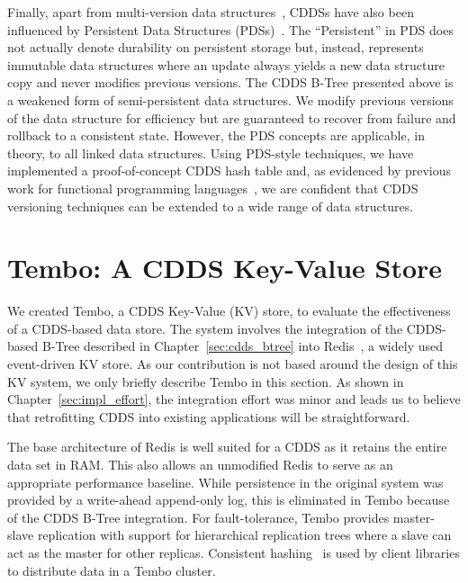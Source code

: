 Finally, apart from multi-version data
structures~\citep{Becker96,Varman97}, CDDSs have also been influenced
by Persistent Data Structures (PDSs)~\citep{Driscoll89}.  The
``Persistent'' in PDS does not actually denote durability on
persistent storage but, instead, represents immutable data structures
where an update always yields a new data structure copy and never
modifies previous versions.  The CDDS B-Tree presented above is a
weakened form of semi-persistent data structures.  We modify previous
versions of the data structure for efficiency but are guaranteed to
recover from failure and rollback to a consistent state.  However, the
PDS concepts are applicable, in theory, to all linked data structures.
Using PDS-style techniques, we have implemented a proof-of-concept
CDDS hash table and, as evidenced by previous work for functional
programming languages~\citep{Okasaki99}, we are confident that CDDS
versioning techniques can be extended to a wide range of data
structures.

\section{Tembo: A CDDS Key-Value Store}
\label{sec:kv}

We created Tembo, a CDDS Key-Value (KV) store, to evaluate the
effectiveness of a CDDS-based data store.  The system involves the
integration of the CDDS-based B-Tree described in
Chapter~\ref{sec:cdds_btree} into Redis~\citep{Redis}, a widely used
event-driven KV store.  As our contribution is not based around the
design of this KV system, we only briefly describe Tembo in this
section.  As shown in Chapter~\ref{sec:impl_effort}, the integration
effort was minor and leads us to believe that retrofitting CDDS into
existing applications will be straightforward.


The base architecture of Redis is well suited for a CDDS as it retains
the entire data set in RAM\@.  This also allows an unmodified Redis to
serve as an appropriate performance baseline.  While persistence in
the original system was provided by a write-ahead append-only log,
this is eliminated in Tembo because of the CDDS B-Tree integration.
For fault-tolerance, Tembo provides master-slave replication with
support for hierarchical replication trees where a slave can act as
the master for other replicas.  Consistent hashing~\citep{Karger97} is
used by client libraries to distribute data in a Tembo cluster.


